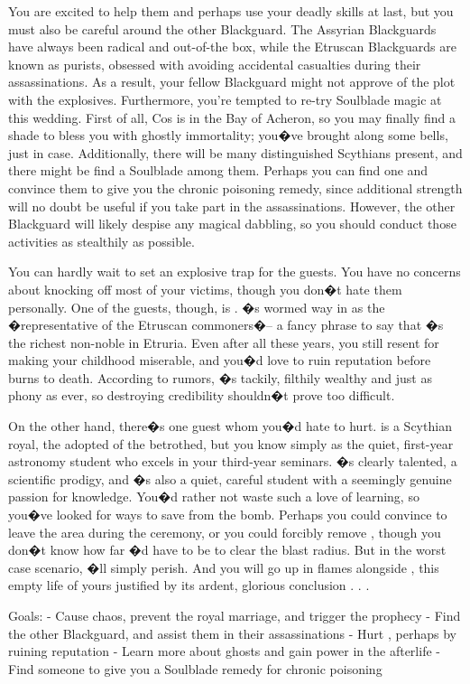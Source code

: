 \documentclass[char]{Kos}
\begin{document}
You are excited to help them and perhaps use your deadly skills at last, but you must also be careful around the other Blackguard. The Assyrian Blackguards have always been radical and out-of-the box, while the Etruscan Blackguards are known as purists, obsessed with avoiding accidental casualties during their assassinations. As a result, your fellow Blackguard might not approve of the plot with the explosives. Furthermore, you're tempted to re-try Soulblade magic at this wedding. First of all, Cos is in the Bay of Acheron, so you may finally find a shade to bless you with ghostly immortality; you�ve brought along some bells, just in case. Additionally, there will be many distinguished Scythians present, and there might be find a Soulblade among them. Perhaps you can find one and convince them to give you the chronic poisoning remedy, since additional strength will no doubt be useful if you take part in the assassinations. However, the other Blackguard will likely despise any magical dabbling, so you should conduct those activities as stealthily as possible.

You can hardly wait to set an explosive trap for the guests. You have no concerns about knocking off most of your victims, though you don�t hate them personally. One of the guests, though, is \cMerchant{\nickname}. \cMerchant{\They}�s wormed \cMerchant{\their} way in as the �representative of the Etruscan commoners�-- a fancy phrase to say that \cMerchant{\they}�s the richest non-noble in Etruria. Even after all these years, you still resent \cMerchant{\them} for making your childhood miserable, and you�d love to ruin \cMerchant{\their} reputation before \cMerchant{\they} burns to death. According to rumors, \cMerchant{\they}�s tackily, filthily wealthy and just as phony as ever, so destroying \cMerchant{\their} credibility shouldn�t prove too difficult.

On the other hand, there�s one guest whom you�d hate to hurt. \cWard{\nickname} is a Scythian royal, the adopted \cWard{\sibling} of the betrothed, but you know \cWard{\them} simply as the quiet, first-year astronomy student who excels in your third-year seminars. \cWard{\They}�s clearly talented, a scientific prodigy, and \cWard{\they}�s also a quiet, careful student with a seemingly genuine passion for knowledge. You�d rather not waste such a love of learning, so you�ve looked for ways to save \cWard{\them} from the bomb. Perhaps you could convince \cWard{\them} to leave the area during the ceremony, or you could forcibly remove \cWard{\them}, though you don�t know how far \cWard{\they}�d have to be to clear the blast radius. But in the worst case scenario, \cWard{\they}�ll simply perish. And you will go up in flames alongside \cWard{\them}, this empty life of yours justified by its ardent, glorious conclusion . . .

Goals:
- Cause chaos, prevent the royal marriage, and trigger the prophecy
- Find the other Blackguard, and assist them in their assassinations
- Hurt \cMerchant{\nickname}, perhaps by ruining \cMerchant{\their} reputation
- Learn more about ghosts and gain power in the afterlife
- Find someone to give you a Soulblade remedy for chronic poisoning
\end{document}
